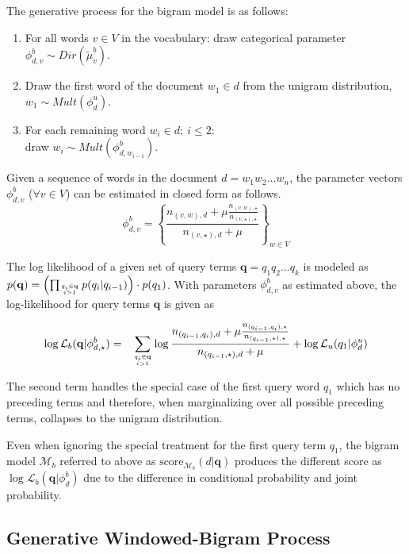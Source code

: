 \documentclass[]{article}
\begin{document}
The generative process for the bigram model is as follows:
\begin{enumerate}
\item For all words $v\in V$ in the vocabulary: draw categorical parameter
$\phi_{d,v}^{b}\sim Dir(\tilde{\mu}_{v}^{b})$.
\item Draw the first word of the document $w_{1}\in d$ from the unigram
distribution, $w_{1}\sim Mult(\phi_{d}^{u})$.
\item For each remaining word $w_{i}\in d;\:i\leq2$: \\
draw $w_{i}\sim Mult(\phi_{d,w_{i-1}}^{b})$.
\end{enumerate}
Given a sequence of words in the document $d=w_{1}w_{2}\dots w_{n}$,
the parameter vectors $\phi_{d,v}^{b}$ ($\forall v\in V$) can be
estimated in closed form as follows.
\[
\phi_{d,v}^{b}=\left\{ \frac{n_{(v,w),d}+\mu\frac{n_{(v,w),\star}}{n_{(v,\star),\star}}}{n_{(v,\star),d}+\mu}\right\} _{w\in V}
\]

The log likelihood of a given set of query terms $\mathbf{q}=q_{1}q_{2}\dots q_{k}$
is modeled as $p(\mathbf{q})=\left(\prod_{{q_{i}\in\mathbf{q}\atop i>1}}p(q_{i}|q_{i-1})\right)\cdot p(q_{1})$.
With parameters $\phi_{d,v}^{b}$ as estimated above, the log-likelihood
for query terms $\mathbf{q}$ is given as

\begin{eqnarray*}
\log\mathcal{L}_{b}(\mathbf{q}|\phi_{d,\star}^{b}) & = & \sum_{{q_{i}\in\mathbf{q}\atop i>1}}\log\frac{n_{(q_{i-1},q_{i}),d}+\mu\frac{n_{(q_{i-1},q_{i}),\star}}{n_{(q_{i-1},\star),\star}}}{n_{(q_{i-1},\star),d}+\mu}  +\log\mathcal{L}_{u}(q_{1}|\phi_{d}^{u})
\end{eqnarray*}

The second term handles the special case of the first query word $q_{1}$ which has
no preceding terms and therefore, when marginalizing over all possible preceding terms,  collapses to the unigram distribution.

Even when ignoring the special treatment for the first query term
$q_{1}$, the bigram model $\mathcal{M}_{b}$ referred to above as
$\mbox{score}_{\mathcal{M}_{b}}(d|\mathbf{q})$ produces the different
score as $\log\mathcal{L}_{b}(\mathbf{q}|\phi_{d}^{b})$ due to the
difference in conditional probability and joint probability.

\subsection{Generative Windowed-Bigram Process\label{subsec:Generative-windowed-bigram-proce}}
\end{document}
